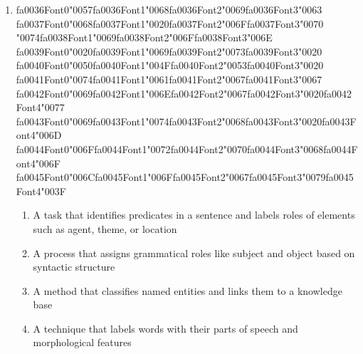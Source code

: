 \documentclass[12pt]{article}
\begin{document}
\begin{enumerate}[label=Q\arabic*.]
\item {\csname fa0036Font0\endcsname\char"0057}{\csname fa0036Font1\endcsname\char"0068}{\csname fa0036Font2\endcsname\char"0069}{\csname fa0036Font3\endcsname\char"0063} {\csname fa0037Font0\endcsname\char"0068}{\csname fa0037Font1\endcsname\char"0020}{\csname fa0037Font2\endcsname\char"006F}{\csname fa0037Font3\endcsname\char"0070} {\char"0074}{\csname fa0038Font1\endcsname\char"0069}{\csname fa0038Font2\endcsname\char"006F}{\csname fa0038Font3\endcsname\char"006E} {\csname fa0039Font0\endcsname\char"0020}{\csname fa0039Font1\endcsname\char"0069}{\csname fa0039Font2\endcsname\char"0073}{\csname fa0039Font3\endcsname\char"0020} {\csname fa0040Font0\endcsname\char"0050}{\csname fa0040Font1\endcsname\char"004F}{\csname fa0040Font2\endcsname\char"0053}{\csname fa0040Font3\endcsname\char"0020} {\csname fa0041Font0\endcsname\char"0074}{\csname fa0041Font1\endcsname\char"0061}{\csname fa0041Font2\endcsname\char"0067}{\csname fa0041Font3\endcsname\char"0067} {\csname fa0042Font0\endcsname\char"0069}{\csname fa0042Font1\endcsname\char"006E}{\csname fa0042Font2\endcsname\char"0067}{\csname fa0042Font3\endcsname\char"0020}{\csname fa0042Font4\endcsname\char"0077} {\csname fa0043Font0\endcsname\char"0069}{\csname fa0043Font1\endcsname\char"0074}{\csname fa0043Font2\endcsname\char"0068}{\csname fa0043Font3\endcsname\char"0020}{\csname fa0043Font4\endcsname\char"006D} {\csname fa0044Font0\endcsname\char"006F}{\csname fa0044Font1\endcsname\char"0072}{\csname fa0044Font2\endcsname\char"0070}{\csname fa0044Font3\endcsname\char"0068}{\csname fa0044Font4\endcsname\char"006F} {\csname fa0045Font0\endcsname\char"006C}{\csname fa0045Font1\endcsname\char"006F}{\csname fa0045Font2\endcsname\char"0067}{\csname fa0045Font3\endcsname\char"0079}{\csname fa0045Font4\endcsname\char"003F}
\begin{enumerate}[label=(\Alph*)]
    \item A task that identifies predicates in a sentence and labels roles of elements such as agent, theme, or location
    \item A process that assigns grammatical roles like subject and object based on syntactic structure
    \item A method that classifies named entities and links them to a knowledge base
    \item A technique that labels words with their parts of speech and morphological features 
\end{enumerate}

\end{enumerate}
\end{document}
